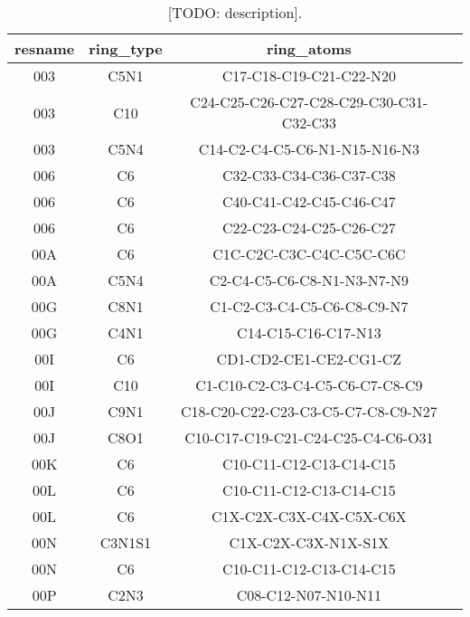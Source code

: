\begin{table}[H]
  \caption{\label{tab:methods/aromatic_ligand} [TODO: description].}
  \centering
  \begin{tabular}{cccc}
    \hline
    resname & ring\_type & ring\_atoms                             &  \\ \hline
    003     & C5N1       & C17-C18-C19-C21-C22-N20                 &  \\
    003     & C10        & C24-C25-C26-C27-C28-C29-C30-C31-C32-C33 &  \\
    003     & C5N4       & C14-C2-C4-C5-C6-N1-N15-N16-N3           &  \\
    006     & C6         & C32-C33-C34-C36-C37-C38                 &  \\
    006     & C6         & C40-C41-C42-C45-C46-C47                 &  \\
    006     & C6         & C22-C23-C24-C25-C26-C27                 &  \\
    00A     & C6         & C1C-C2C-C3C-C4C-C5C-C6C                 &  \\
    00A     & C5N4       & C2-C4-C5-C6-C8-N1-N3-N7-N9              &  \\
    00G     & C8N1       & C1-C2-C3-C4-C5-C6-C8-C9-N7              &  \\
    00G     & C4N1       & C14-C15-C16-C17-N13                     &  \\
    00I     & C6         & CD1-CD2-CE1-CE2-CG1-CZ                  &  \\
    00I     & C10        & C1-C10-C2-C3-C4-C5-C6-C7-C8-C9          &  \\
    00J     & C9N1       & C18-C20-C22-C23-C3-C5-C7-C8-C9-N27      &  \\
    00J     & C8O1       & C10-C17-C19-C21-C24-C25-C4-C6-O31       &  \\
    00K     & C6         & C10-C11-C12-C13-C14-C15                 &  \\
    00L     & C6         & C10-C11-C12-C13-C14-C15                 &  \\
    00L     & C6         & C1X-C2X-C3X-C4X-C5X-C6X                 &  \\
    00N     & C3N1S1     & C1X-C2X-C3X-N1X-S1X                     &  \\
    00N     & C6         & C10-C11-C12-C13-C14-C15                 &  \\
    00P     & C2N3       & C08-C12-N07-N10-N11                     &  \\ \hline
  \end{tabular}
\end{table}

